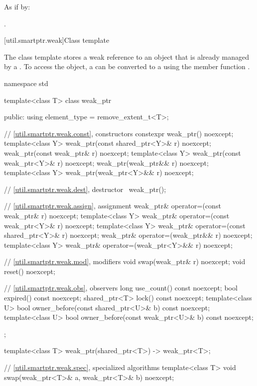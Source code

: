 \begin{itemdescr}
\pnum\effects As if by: 

\pnum\returns  {}.
\end{itemdescr}

[util.smartptr.weak]{Class template }

\pnum
{}%
The  class template stores a weak reference to an object
that is already managed by a . To access the object, a
 can be converted to a  using the member
function .

\begin{codeblock}
namespace std {
  template<class T> class weak_ptr {
  public:
    using element_type = remove_extent_t<T>;

    // \ref{util.smartptr.weak.const}, constructors
    constexpr weak_ptr() noexcept;
    template<class Y>
      weak_ptr(const shared_ptr<Y>& r) noexcept;
    weak_ptr(const weak_ptr& r) noexcept;
    template<class Y>
      weak_ptr(const weak_ptr<Y>& r) noexcept;
    weak_ptr(weak_ptr&& r) noexcept;
    template<class Y>
      weak_ptr(weak_ptr<Y>&& r) noexcept;

    // \ref{util.smartptr.weak.dest}, destructor
    ~weak_ptr();

    // \ref{util.smartptr.weak.assign}, assignment
    weak_ptr& operator=(const weak_ptr& r) noexcept;
    template<class Y>
      weak_ptr& operator=(const weak_ptr<Y>& r) noexcept;
    template<class Y>
      weak_ptr& operator=(const shared_ptr<Y>& r) noexcept;
    weak_ptr& operator=(weak_ptr&& r) noexcept;
    template<class Y>
      weak_ptr& operator=(weak_ptr<Y>&& r) noexcept;

    // \ref{util.smartptr.weak.mod}, modifiers
    void swap(weak_ptr& r) noexcept;
    void reset() noexcept;

    // \ref{util.smartptr.weak.obs}, observers
    long use_count() const noexcept;
    bool expired() const noexcept;
    shared_ptr<T> lock() const noexcept;
    template<class U>
      bool owner_before(const shared_ptr<U>& b) const noexcept;
    template<class U>
      bool owner_before(const weak_ptr<U>& b) const noexcept;
  };

  template<class T>
    weak_ptr(shared_ptr<T>) -> weak_ptr<T>;

  // \ref{util.smartptr.weak.spec}, specialized algorithms
  template<class T>
    void swap(weak_ptr<T>& a, weak_ptr<T>& b) noexcept;
}
\end{codeblock}

